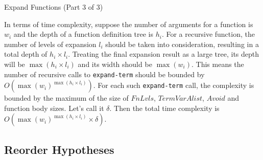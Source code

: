 \begin{algorithm}
  \DontPrintSemicolon


  \setcounter{AlgoLine}{58}
  \;

  \caption{Expand Functions (Part 3 of 3)}\label{alg:expand3}
\end{algorithm}

In terms of time complexity, suppose the number of arguments for a function is
$w_i$ and the depth of a function definition tree is $h_i$. For a recursive
function, the number of levels of expansion $l_i$ should be taken into
consideration, resulting in a total depth of $h_i\times l_i$. Treating the final
expansion result as a large tree, its depth will be $\max(h_i\times l_i)$ and
its width should be $\max(w_i)$. This means the number of recursive calls to
\texttt{expand-term} should be bounded by $O(\max(w_i)^{\max(h_i\times l_i)})$.
For each such \texttt{expand-term} call, the complexity is bounded by the
maximum of the size of $FnLvls$, $TermVarAlist$, $Avoid$ and function body
sizes. Let's call it $\delta$. Then the total time complexity is
$O(\max(w_i)^{\max(h_i\times l_i)}\times\delta)$.

\subsection{Reorder Hypotheses}

